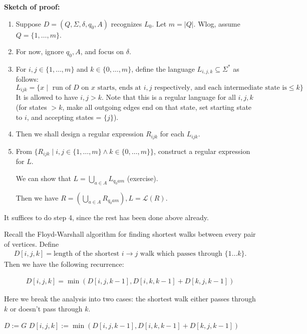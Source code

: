 \documentclass[a4paper]{article}
\newcommand{\mc}{\mathcal}
\renewcommand{\L}{\mc{L}}
\begin{document}
\begin{note}
	\textbf{Sketch of proof:}

	\begin{enumerate}
		\item Suppose $D = (Q, \Sigma, \delta, q_0, A)$ recognizes $L_0$. Let $m = |Q|$. Wlog, assume $Q = \{1, \ldots, m\}$.
		\item For now, ignore $q_0, A$, and focus on $\delta$.
		\item For $i, j \in \{1, \ldots, m\}$ and $k \in \{0, \ldots, m\}$, define the language $L_{i, j, k} \subseteq \Sigma^*$ as follows:
		      \[
			      L_{ijk} = \{x \mid \text{ run of } D \text{ on } x \text{ starts, ends at } i, j \text{ respectively, and each intermediate state is} \le k \}
		      \]
		      It is allowed to have $i, j > k$.
		      Note that this is a regular language for all $i, j, k$ (for states $> k$, make all outgoing edges end on that state, set starting state to $i$, and accepting states = $\{j\}$).
		\item Then we shall design a regular expression $R_{ijk}$ for each $L_{ijk}$.
		\item
		      From $\{R_{ijk} \mid i, j \in \{1, \ldots, m\} \land k \in \{0, \ldots, m\}\}$, construct a regular expression for $L$.

		      We can show that $L = \bigcup_{a \in A} L_{q_0am}$ (exercise).

		      Then we have $R = \left(\bigcup_{a \in A} R_{q_0am}\right), L = \L(R)$.

	\end{enumerate}
	It suffices to do step 4, since the rest has been done above already.

	Recall the Floyd-Warshall algorithm for finding shortest walks between every pair of vertices. Define
	\begin{align*}
		D[i, j, k] = \text{length of the shortest } i \to j \text{ walk which passes through } \{1 \ldots k\}.
	\end{align*}
	Then we have the following recurrence:

	\begin{align*}
		D[i, j, k] = \min(D[i, j, k - 1], D[i, k, k - 1] + D[k, j, k - 1])
	\end{align*}

	Here we break the analysis into two cases: the shortest walk either passes through $k$ or doesn't pass through $k$.

	\begin{algorithmic}[1]
		 
		\State $D := G$
		\State $D[i, j, k] := \min(D[i, j, k - 1], D[i, k, k - 1] + D[k, j, k - 1])$
		\EndFor
		\EndFor
		\EndFor
		\EndFunction
	\end{algorithmic}


\end{note}
\end{document}

